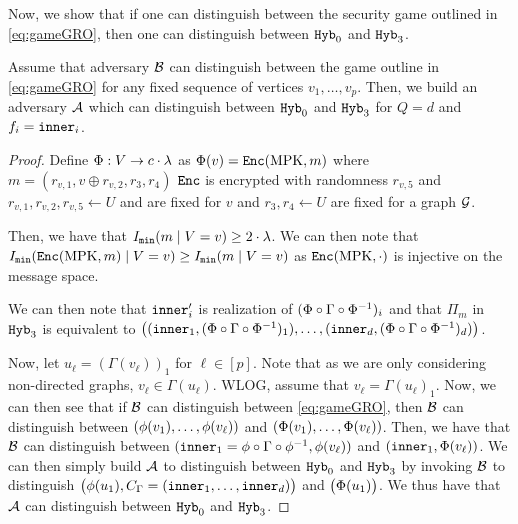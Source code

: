 Now, we show that if one can distinguish between the security game outlined in \cref{eq:gameGRO}, then one can distinguish
between $\texttt{Hyb}_0$ and $\texttt{Hyb}_3$.

\begin{lemma}
	Assume that adversary $\mathcal{B}$ can distinguish between the game outline in \cref{eq:gameGRO} for any fixed sequence of vertices $v_1, \dots, v_p$.
	Then, we build an adversary
	$\mathcal{A}$ which can distinguish between $\texttt{Hyb}_0$ and $\texttt{Hyb}_3$ for $Q = d$ and $f_i = \texttt{inner}_i$.
	\begin{proof}
		Define $\Phi : V \rightarrow c \cdot \lambda$ as $\Phi(v) = \texttt{Enc}(\text{MPK}, m)$ 
		where $m = (r_{v, 1}, v \oplus r_{v, 2}, r_3, r_4)$
		$\texttt{Enc}$ is encrypted with randomness $r_{v, 5}$ and $r_{v, 1}, r_{v, 2}, r_{v, 5} \leftarrow U$ and are fixed for $v$
		and $r_3, r_4 \leftarrow U$ are fixed for a graph $\mathcal{G}$.

		Then, we have that $I_\texttt{min}(m \mid V = v) \geq 2 \cdot \lambda$. We can then note that $I_\texttt{min}(\texttt{Enc}(\text{MPK}, m) \mid V = v) \geq I_\texttt{min}(m \mid V = v)$
		as $\texttt{Enc}(\text{MPK}, \cdot)$ is injective on the message space.
		
		We can then note that $\texttt{inner}_i'$ is realization
		of $(\Phi \circ \Gamma \circ \Phi^{-1})_i$ and that $\Pi_m$ in $\texttt{Hyb}_3$ 
		is equivalent to $\big((\texttt{inner}_1, (\Phi \circ \Gamma \circ \Phi^{-1})_1), \dots, (\texttt{inner}_d, (\Phi \circ \Gamma \circ \Phi^{-1})_d)\big)$.

		Now, let $u_\ell = (\Gamma(v_\ell))_1$ for $\ell \in [p]$. Note that as we are only considering non-directed graphs,
		$v_\ell \in \Gamma(u_\ell)$.
		WLOG, assume that $v_\ell = \Gamma(u_\ell)_1$.
		Now, we can then see that if $\mathcal{B}$ can distinguish between \cref{eq:gameGRO}, then $\mathcal{B}$ can distinguish between
		$(\phi(v_1), \dots, \phi(v_\ell))$ and $(\Phi(v_1), \dots, \Phi(v_\ell))$.
		Then, we have that $\mathcal{B}$ can distinguish between $(\texttt{inner}_1 = \phi \circ \Gamma \circ \phi^{-1}, \phi(v_\ell))$ and $(\texttt{inner}_1, \Phi(v_\ell))$.
		We can then simply build $\mathcal{A}$ to distinguish between $\texttt{Hyb}_0$ and $\texttt{Hyb}_3$ by invoking $\mathcal{B}$ to distinguish
		$\big(\phi(u_1), C_\Gamma = (\texttt{inner}_1, \dots, \texttt{inner}_d)\big)$ and $\big(\Phi(u_1)\big)$.
		We thus have that $\mathcal{A}$ can distinguish between $\texttt{Hyb}_0$ and $\texttt{Hyb}_3$.
	\end{proof}
\end{lemma}
